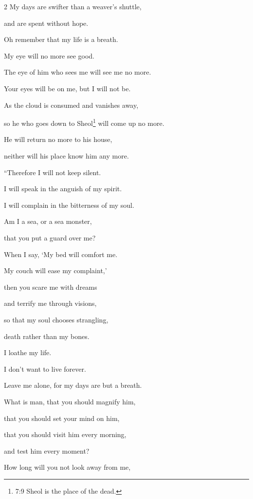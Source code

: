 \begin{multicols}{2}
	\myverse{}My days are swifter than a weaver’s shuttle,
	
	and are spent without hope.
	
	\myverse{}Oh remember that my life is a breath.
	
	My eye will no more see good.
	
	\myverse{}The eye of him who sees me will see me no more.
	
	Your eyes will be on me, but I will not be.
	
	\myverse{}As the cloud is consumed and vanishes away,
	
	so he who goes down to Sheol\footnote{7:9 Sheol is the place of the dead.} will come up no more.
	
	\myverse{}He will return no more to his house,
	
	neither will his place know him any more.
	
	\vspace{\baselineskip}
	
	\myverse{}“Therefore I will not keep silent.
	
	I will speak in the anguish of my spirit.
	
	I will complain in the bitterness of my soul.
	
	\myverse{}Am I a sea, or a sea monster,
	
	that you put a guard over me?
	
	\myverse{}When I say, ‘My bed will comfort me.
	
	My couch will ease my complaint,’
	
	\myverse{}then you scare me with dreams
	
	and terrify me through visions,
	
	\myverse{}so that my soul chooses strangling,
	
	death rather than my bones.
	
	\myverse{}I loathe my life.
	
	I don’t want to live forever.
	
	Leave me alone, for my days are but a breath.
	
	\myverse{}What is man, that you should magnify him,
	
	that you should set your mind on him,
	
	\myverse{}that you should visit him every morning,
	
	and test him every moment?
	
	\myverse{}How long will you not look away from me,
	

\end{multicols}
